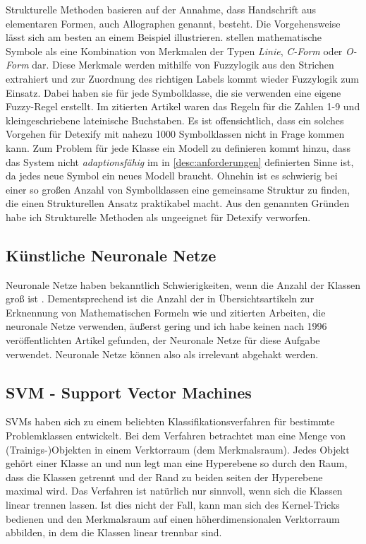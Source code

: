 Strukturelle Methoden basieren auf der Annahme, dass Handschrift aus elementaren Formen, auch Allographen genannt, besteht. Die Vorgehensweise lässt sich am besten an einem Beispiel illustrieren. \citet{Fitzgerald:2004p10858} stellen mathematische Symbole als eine Kombination von Merkmalen der Typen \emph{Linie}, \emph{C-Form} oder \emph{O-Form} dar. Diese Merkmale werden mithilfe von Fuzzylogik aus den Strichen extrahiert und zur Zuordnung des richtigen Labels kommt wieder Fuzzylogik zum Einsatz. Dabei haben sie für jede Symbolklasse, die sie verwenden eine eigene Fuzzy-Regel erstellt. Im zitierten Artikel waren das Regeln für die Zahlen 1-9 und kleingeschriebene lateinische Buchstaben.
Es ist offensichtlich, dass ein solches Vorgehen für Detexify mit nahezu 1000 Symbolklassen nicht in Frage kommen kann. Zum Problem für jede Klasse ein Modell zu definieren kommt hinzu, dass das System nicht \emph{adaptionsfähig} im in \ref{desc:anforderungen} definierten Sinne ist, da jedes neue Symbol ein neues Modell braucht. Ohnehin ist es schwierig bei einer so großen Anzahl von Symbolklassen eine gemeinsame Struktur zu finden, die einen Strukturellen Ansatz praktikabel macht.
Aus den genannten Gründen habe ich Strukturelle Methoden als ungeeignet für Detexify verworfen.

\subsection{Künstliche Neuronale Netze}
\label{sub:kuenstliche_neuronale_netze}

Neuronale Netze haben bekanntlich Schwierigkeiten, wenn die Anzahl der Klassen groß ist \cite{Jaeger:2003p1097}. Dementsprechend ist die Anzahl der in Übersichtsartikeln zur Erknennung von Mathematischen Formeln wie \cite{Chan:2000p559} und \cite{Tapia:2007p9160} zitierten Arbeiten, die neuronale Netze verwenden, äußerst gering und ich habe keinen nach 1996 veröffentlichten Artikel gefunden, der Neuronale Netze für diese Aufgabe verwendet. Neuronale Netze können also als irrelevant abgehakt werden.

\subsection[SVM]{SVM - Support Vector Machines}
\label{sub:svm}

\ac{SVM}s haben sich zu einem beliebten Klassifikationsverfahren für bestimmte Problemklassen entwickelt. Bei dem Verfahren betrachtet man eine Menge von (Trainigs-)Objekten in einem Verktorraum (dem Merkmalsraum). Jedes Objekt gehört einer Klasse an und nun legt man eine Hyperebene so durch den Raum, dass die Klassen getrennt und der Rand zu beiden seiten der Hyperebene maximal wird. Das Verfahren ist natürlich nur sinnvoll, wenn sich die Klassen linear trennen lassen. Ist dies nicht der Fall, kann man sich des Kernel-Tricks bedienen und den Merkmalsraum auf einen höherdimensionalen Verktorraum abbilden, in dem die Klassen linear trennbar sind.

